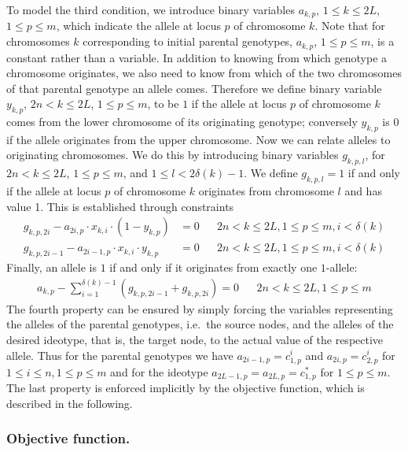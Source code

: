 \documentclass[runningheads]{llncs}
\begin{document}
To model the third condition, we introduce 
binary variables $a_{k,p}$, $1 \leq k \leq 2L$, $1 \leq p \leq m$, which indicate the allele at locus $p$ of chromosome $k$. Note that for chromosomes $k$ corresponding to initial parental genotypes, $a_{k,p}$, $1 \leq p \leq m$, is a constant rather than a variable. In addition to knowing from which genotype a chromosome originates, we also need to know from which of the two chromosomes of that 
parental genotype an allele comes. Therefore we define binary variable $y_{k,p}$, $2n < k \leq 2L$, $1 \leq p \leq m$, to be $1$ if the allele at locus $p$
of chromosome $k$ comes from the lower chromosome of its originating genotype;
conversely $y_{k,p}$ is $0$ if the allele originates from the upper chromosome.
Now we can relate alleles to originating chromosomes. We do this by introducing
binary variables $g_{k,p,l}$, for $2n < k \leq 2L$, $1 \leq p \leq m$, and $1 \leq l<2\delta(k)-1$.
We define $g_{k,p,l} = 1$ if and only if the allele at locus $p$ of chromosome
$k$ originates from chromosome $l$ and has value 1. This is established through constraints
\begin{align}
  \label{eq:ilp_g1}
  g_{k,p,2i} - a_{2i,p} \cdot x_{k,i} \cdot (1-y_{k,p}) & = 0 && 2n < k \leq 2L, 1 \leq p \leq m, i < \delta(k)\\
 \label{eq:ilp_g2}
  g_{k,p,2i-1}   - a_{2i-1,p} \cdot x_{k,i} \cdot y_{k,p} &= 0 && 2n < k \leq 2L, 1 \leq p \leq m, i < \delta(k)
\end{align}
Finally, an allele is $1$ if and only if it originates from exactly one $1$-allele:
\begin{align}
  \label{eq:ilp_g3}
   a_{k,p} - \sum_{i = 1}^{\delta(k) - 1} (g_{k,p,2i-1} + g_{k,p,2i}) = 0&& 2n < k \leq 2L, 1 \leq p \leq m
\end{align}
The fourth property can be ensured by simply forcing the variables representing the alleles of the parental genotypes, i.e.~the source nodes,
and the alleles of the desired ideotype, that is, the target node, to the actual value of the respective allele. Thus for the parental genotypes we have $a_{2i-1,p} = c^i_{1,p}$ and $a_{2i,p}  = c^i_{2,p}$ for $1 \leq i \leq n, 1 \leq p \leq m$
and for the ideotype $a_{2L-1,p} = a_{2L,p} = c^*_{1,p}$ for $1 \leq p \leq m$.
The last property is enforced implicitly by the objective function, which is described in the following. 

\subsubsection{Objective function.}
\end{document}
